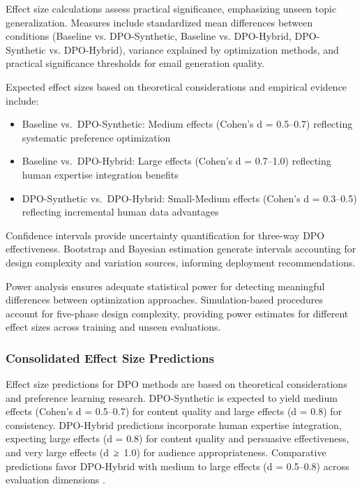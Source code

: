 Effect size calculations assess practical significance, emphasizing unseen topic generalization. Measures include standardized mean differences between conditions (Baseline vs. DPO-Synthetic, Baseline vs. DPO-Hybrid, DPO-Synthetic vs. DPO-Hybrid), variance explained by optimization methods, and practical significance thresholds for email generation quality.

Expected effect sizes based on theoretical considerations and empirical evidence include:
\begin{itemize}
\item Baseline vs.~DPO-Synthetic: Medium effects (Cohen's d = 0.5--0.7) reflecting systematic preference optimization
\item Baseline vs.~DPO-Hybrid: Large effects (Cohen's d = 0.7--1.0) reflecting human expertise integration benefits
\item DPO-Synthetic vs.~DPO-Hybrid: Small-Medium effects (Cohen's d = 0.3--0.5) reflecting incremental human data advantages
\end{itemize}

Confidence intervals provide uncertainty quantification for three-way DPO effectiveness. Bootstrap and Bayesian estimation generate intervals accounting for design complexity and variation sources, informing deployment recommendations.

Power analysis ensures adequate statistical power for detecting meaningful differences between optimization approaches. Simulation-based procedures account for five-phase design complexity, providing power estimates for different effect sizes across training and unseen evaluations.

\subsubsection{Consolidated Effect Size Predictions}

Effect size predictions for DPO methods are based on theoretical considerations and preference learning research. DPO-Synthetic is expected to yield medium effects (Cohen's d = 0.5--0.7) for content quality and large effects (d = 0.8) for consistency. DPO-Hybrid predictions incorporate human expertise integration, expecting large effects (d = 0.8) for content quality and persuasive effectiveness, and very large effects (d~≥~1.0) for audience appropriateness. Comparative predictions favor DPO-Hybrid with medium to large effects (d = 0.5--0.8) across evaluation dimensions \cite{poddar2024personalizing_rlhf, liu2024human_ai_teaming}.

